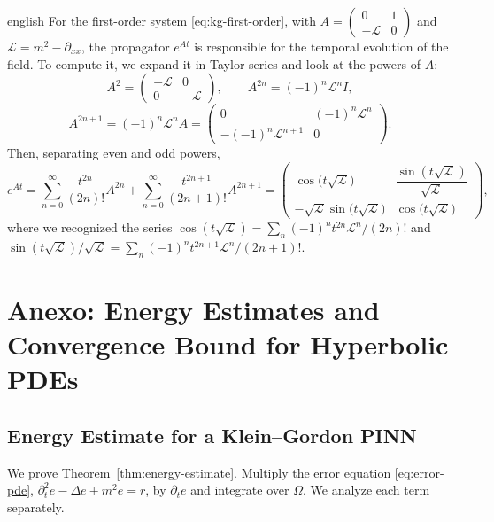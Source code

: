 \documentclass[11pt,letterpaper,twoside,openright]{book} %
\renewcommand{\chaptermark}[1]{\markboth{#1}{}}
\begin{document}
\begin{hyphenrules}{english}
For the first-order system \eqref{eq:kg-first-order}, with $A=\begin{pmatrix}0&1\\-\mathcal{L}&0\end{pmatrix}$
and $\mathcal{L}=m^2-\partial_{xx}$, the propagator $e^{At}$ is responsible for the temporal evolution of
the field. To compute it, we expand it in Taylor series and look at the powers of $A$:
\[
  A^2=\begin{pmatrix}-\mathcal{L} & 0\\ 0 & -\mathcal{L}\end{pmatrix},\qquad
  A^{2n}=(-1)^n\mathcal{L}^{n}I,
\]
\[
  A^{2n+1}=(-1)^n\mathcal{L}^{n}A=\begin{pmatrix}0 & (-1)^n\mathcal{L}^{n}\\ -(-1)^n\mathcal{L}^{n+1} & 0\end{pmatrix}.
\]
Then, separating even and odd powers,
\begin{equation}
  e^{At}=\sum_{n=0}^{\infty}\frac{t^{2n}}{(2n)!}A^{2n}+\sum_{n=0}^{\infty}\frac{t^{2n+1}}{(2n+1)!}A^{2n+1}
  =\begin{pmatrix}
    \cos\big(t\sqrt{\mathcal{L}}\big) & \dfrac{\sin(t\sqrt{\mathcal{L}})}{\sqrt{\mathcal{L}}}\\[2mm]
    -\sqrt{\mathcal{L}}\sin\big(t\sqrt{\mathcal{L}}\big) & \cos\big(t\sqrt{\mathcal{L}}\big)
  \end{pmatrix},
  \label{eq:app-kg-propagator}
\end{equation}
where we recognized the series
$\cos(t\sqrt{\mathcal{L}})=\sum_n(-1)^nt^{2n}\mathcal{L}^n/(2n)!$ and
$\sin(t\sqrt{\mathcal{L}})/\sqrt{\mathcal{L}}=\sum_n(-1)^nt^{2n+1}\mathcal{L}^n/(2n+1)!$.

\chapter{Anexo: Energy Estimates and Convergence Bound for Hyperbolic PDEs}\chaptermark{Energy Estimates}\label{app:derivations}

\section{Energy Estimate for a Klein--Gordon PINN}\label{app:energy}

We prove Theorem~\ref{thm:energy-estimate}. Multiply the error equation \eqref{eq:error-pde},
$\partial_t^2e-\Delta e+m^2e=r$, by $\partial_te$ and integrate over $\Omega$. We analyze each term
separately.


\end{hyphenrules}
\end{document}
